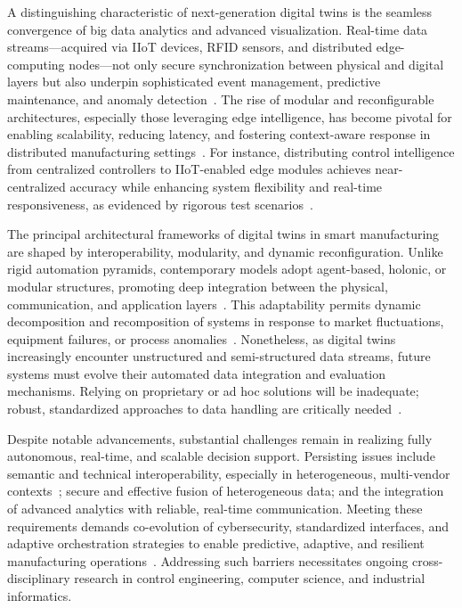\documentclass[sigconf]{acmart}
\begin{document}
A distinguishing characteristic of next-generation digital twins is the seamless convergence of big data analytics and advanced visualization. Real-time data streams---acquired via IIoT devices, RFID sensors, and distributed edge-computing nodes---not only secure synchronization between physical and digital layers but also underpin sophisticated event management, predictive maintenance, and anomaly detection~\cite{ref4,ref8,ref11,ref12,ref13,ref14,ref16,ref18,ref19,ref20,ref27,ref28,ref29,ref30,ref36,ref38,ref41,ref43,ref44,ref45,ref57,ref59,ref91}. The rise of modular and reconfigurable architectures, especially those leveraging edge intelligence, has become pivotal for enabling scalability, reducing latency, and fostering context-aware response in distributed manufacturing settings~\cite{ref91}. For instance, distributing control intelligence from centralized controllers to IIoT-enabled edge modules achieves near-centralized accuracy while enhancing system flexibility and real-time responsiveness, as evidenced by rigorous test scenarios~\cite{ref3}.

The principal architectural frameworks of digital twins in smart manufacturing are shaped by interoperability, modularity, and dynamic reconfiguration. Unlike rigid automation pyramids, contemporary models adopt agent-based, holonic, or modular structures, promoting deep integration between the physical, communication, and application layers~\cite{ref25}. This adaptability permits dynamic decomposition and recomposition of systems in response to market fluctuations, equipment failures, or process anomalies~\cite{ref3}. Nonetheless, as digital twins increasingly encounter unstructured and semi-structured data streams, future systems must evolve their automated data integration and evaluation mechanisms. Relying on proprietary or ad hoc solutions will be inadequate; robust, standardized approaches to data handling are critically needed~\cite{ref91}.

Despite notable advancements, substantial challenges remain in realizing fully autonomous, real-time, and scalable decision support. Persisting issues include semantic and technical interoperability, especially in heterogeneous, multi-vendor contexts~\cite{ref25}; secure and effective fusion of heterogeneous data; and the integration of advanced analytics with reliable, real-time communication. Meeting these requirements demands co-evolution of cybersecurity, standardized interfaces, and adaptive orchestration strategies to enable predictive, adaptive, and resilient manufacturing operations~\cite{ref4,ref91}. Addressing such barriers necessitates ongoing cross-disciplinary research in control engineering, computer science, and industrial informatics.
\end{document}
